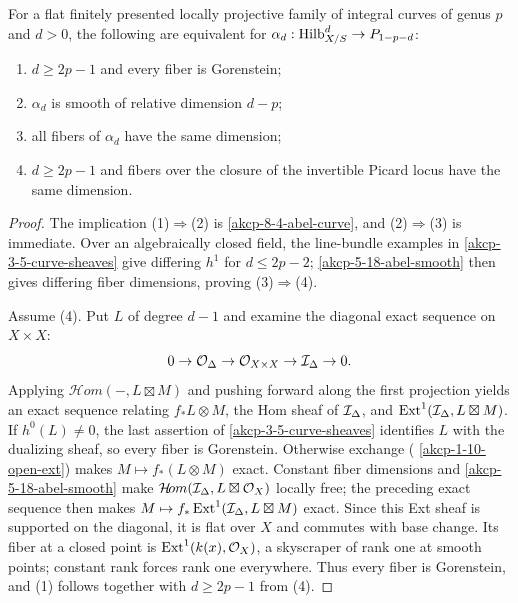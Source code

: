 \begin{theorem}
\label{akcp-8-6-dsouza-rego}
For a flat finitely presented locally projective family of integral curves of
genus $p$ and $d>0$, the following are equivalent for
$\alpha_d:\operatorname{Hilb}^d_{X/S}\to P_{1-p-d}$:
\begin{enumerate}
\item $d\ge2p-1$ and every fiber is Gorenstein;
\item $\alpha_d$ is smooth of relative dimension $d-p$;
\item all fibers of $\alpha_d$ have the same dimension;
\item $d\ge2p-1$ and fibers over the closure of the invertible Picard locus
      have the same dimension.
\end{enumerate}
\end{theorem}
\begin{proof}
The implication (1)$\Rightarrow$(2) is \cref{akcp-8-4-abel-curve}, and
(2)$\Rightarrow$(3) is immediate.  Over an algebraically closed field, the
line-bundle examples in \cref{akcp-3-5-curve-sheaves} give differing $h^1$
for $d\le2p-2$; \cref{akcp-5-18-abel-smooth} then gives differing fiber
dimensions, proving (3)$\Rightarrow$(4).

Assume (4).  Put $L$ of degree $d-1$ and examine the diagonal exact sequence
on $X\times X$:
\[
0\to\mathcal O_{\Delta}\to\mathcal O_{X\times X}\to\mathcal I_\Delta\to0.
\]
Applying $\mathcal H\!om(-,L\boxtimes M)$ and pushing forward along the first
projection yields an exact sequence relating $f_*L\otimes M$, the Hom sheaf
of $\mathcal I_\Delta$, and $\operatorname{Ext}^1(\mathcal I_\Delta,L\boxtimes M)$.  If $h^0(L)\ne0$,
the last assertion of \cref{akcp-3-5-curve-sheaves} identifies $L$ with the
dualizing sheaf, so every fiber is Gorenstein.  Otherwise exchange
(
\cref{akcp-1-10-open-ext}) makes $M\mapsto f_*(L\otimes M)$ exact.  Constant
fiber dimensions and \cref{akcp-5-18-abel-smooth} make
$\mathcal H\!om(\mathcal I_\Delta,L\boxtimes\mathcal O_X)$ locally free; the preceding exact
sequence then makes
$M\mapsto f_*\operatorname{Ext}^1(\mathcal I_\Delta,L\boxtimes M)$ exact.  Since this Ext sheaf is
supported on the diagonal, it is flat over $X$ and commutes with base change.
Its fiber at a closed point is $\operatorname{Ext}^1(k(x),\mathcal O_{X})$, a skyscraper of rank one
at smooth points; constant rank forces rank one everywhere.  Thus every fiber is
Gorenstein, and (1) follows together with $d\ge2p-1$ from (4).
\end{proof}

